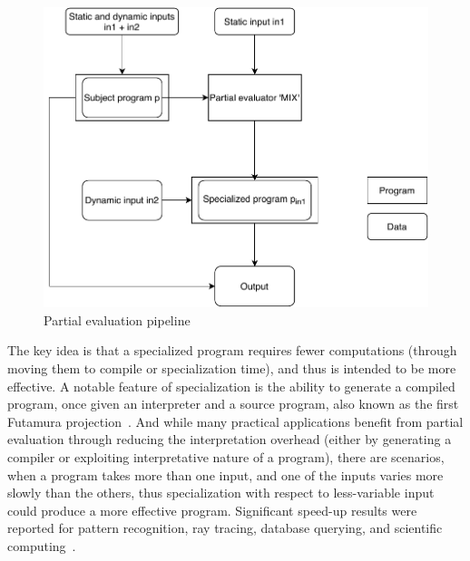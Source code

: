 \begin{figure}
    \centering
    \includegraphics[width=0.85\linewidth]{figures/MixCommutativity.pdf}
    \caption{Partial evaluation pipeline}
    \label{fig:mix}
\end{figure}

The key idea is that a specialized program requires fewer computations (through moving them to compile or specialization time), and thus is intended to be more effective. A notable feature of specialization is the ability to generate a compiled program, once given an interpreter and a source program, also known as the first Futamura projection~\cite{Futamura1999}.
And while many practical applications benefit from partial evaluation through reducing the interpretation overhead (either by generating a compiler or exploiting interpretative nature of a program), there are scenarios, when a program takes more than one input, and one of the inputs varies more slowly than the others, thus specialization with respect to less-variable input could produce a more effective program.
Significant speed-up results were reported for pattern recognition, ray tracing, database querying, and scientific computing~\cite{Jones1993}.

\begin{listing}
\end{listing}


